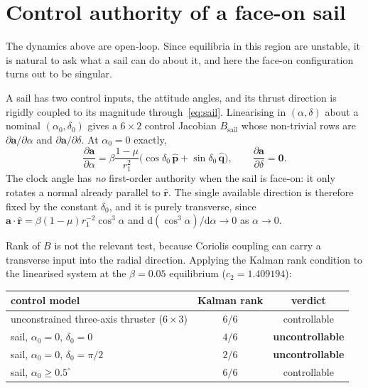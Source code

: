 \documentclass[11pt,a4paper]{article}
\newcommand{\rhat}{\hat{\bm{r}}}
\newcommand{\phat}{\hat{\bm{p}}}
\newcommand{\qhat}{\hat{\bm{q}}}
\begin{document}
\section{Control authority of a face-on sail}\label{sec:control}

The dynamics above are open-loop. Since equilibria in this region are unstable,
it is natural to ask what a sail can do about it, and here the face-on
configuration turns out to be singular.

A sail has two control inputs, the attitude angles, and its thrust direction is
rigidly coupled to its magnitude through~\eqref{eq:sail}. Linearising in
$(\alpha,\delta)$ about a nominal $(\alpha_0,\delta_0)$ gives a $6\times2$
control Jacobian $B_{\mathrm{sail}}$ whose non-trivial rows are
$\partial\bm{a}/\partial\alpha$ and $\partial\bm{a}/\partial\delta$. At
$\alpha_0=0$ exactly,
\begin{equation}
  \frac{\partial\bm{a}}{\partial\alpha}
  = \beta\frac{1-\mu}{r_1^{2}}
    \bigl(\cos\delta_0\,\phat + \sin\delta_0\,\qhat\bigr),
  \qquad
  \frac{\partial\bm{a}}{\partial\delta} = \bm{0} .
  \label{eq:Bsail}
\end{equation}
The clock angle has \emph{no} first-order authority when the sail is face-on: it
only rotates a normal already parallel to $\rhat$. The single available
direction is therefore fixed by the constant $\delta_0$, and it is purely
transverse, since
$\bm{a}\cdot\rhat=\beta(1-\mu)r_1^{-2}\cos^{3}\alpha$ and
$\mathrm{d}(\cos^{3}\alpha)/\mathrm{d}\alpha\to0$ as $\alpha\to0$.

Rank of $B$ is not the relevant test, because Coriolis coupling can carry a
transverse input into the radial direction. Applying the Kalman rank condition
to the linearised system at the $\beta=0.05$ equilibrium ($c_2=1.409194$):

\begin{center}
\begin{tabular}{lcc}
  \toprule
  control model & Kalman rank & verdict \\
  \midrule
  unconstrained three-axis thruster ($6\times3$) & $6/6$ & controllable \\
  sail, $\alpha_0=0$, $\delta_0=0$   & $4/6$ & \textbf{uncontrollable} \\
  sail, $\alpha_0=0$, $\delta_0=\pi/2$ & $2/6$ & \textbf{uncontrollable} \\
  sail, $\alpha_0\geq0.5^\circ$      & $6/6$ & controllable \\
  \bottomrule
\end{tabular}
\end{center}
\end{document}
